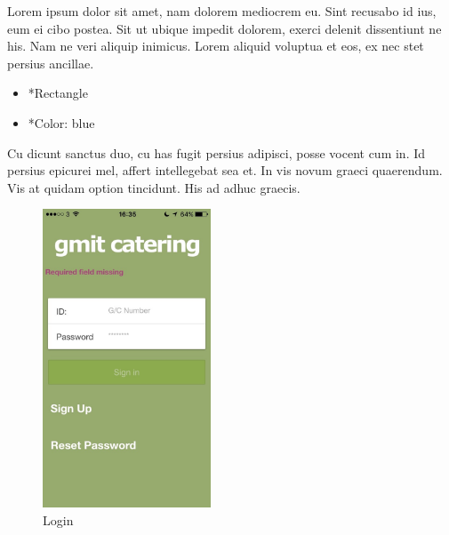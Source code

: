 \begin{minipage}{0.55\textwidth}
	Lorem ipsum dolor sit amet, nam dolorem mediocrem eu. Sint recusabo id ius, eum ei cibo postea. Sit ut ubique impedit dolorem, exerci delenit dissentiunt ne his. Nam ne veri aliquip inimicus. Lorem aliquid voluptua et eos, ex nec stet persius ancillae.
	\begin{itemize}
		\item *Rectangle
		\item *Color: blue
	\end{itemize}
	Cu dicunt sanctus duo, cu has fugit persius adipisci, posse vocent cum in. Id persius epicurei mel, affert intellegebat sea et. In vis novum graeci quaerendum. Vis at quidam option tincidunt. His ad adhuc graecis.
\end{minipage}
\begin{minipage}{5cm}
	\begin{figure}[H]
		\includegraphics[width=5cm]{img/mobile-app/screen-shots/IMG_2904.jpg}
		\caption{Login}
	\end{figure}
\end{minipage} \hfill


